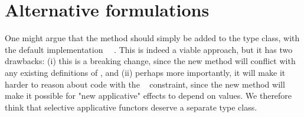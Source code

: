 \section{Alternative formulations}\label{sec-alternatives}

One might argue that the  method should simply be added to the
 type class, with the default implementation
~\hs{=}~. This is indeed a viable approach, but it has
two drawbacks: (i) this is a breaking change, since the new method will conflict
with any existing definitions of , and (ii) perhaps more importantly,
it will make it harder to reason about code with the ~
constraint, since the new method will make it possible for "new applicative"
effects to depend on values. We therefore think that selective applicative
functors deserve a separate type class.


